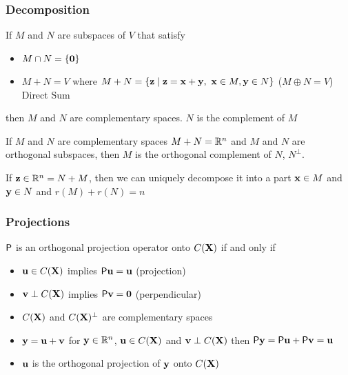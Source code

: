 \documentclass{beamer}
\begin{document}
\begin{frame}
  \frametitle{Decomposition}
  \begin{definition}
    If $M$ and $N$ are subspaces of $V$ that satisfy
    \begin{itemize}
    \item $M \cap N = \{ \zero \}$ \pause
    \item $M + N = V$ where $M+N = \{ \z \mid \z = \x + \y, \  \x \in
      M, \y \in N\}$  ($M \oplus N = V$) Direct Sum \pause
    \end{itemize}
then $M$ and $N$ are complementary spaces. \pause  $N$ is the
complement of $M$ \pause
\end{definition}
\begin{definition}
  If $M$ and $N$ are complementary spaces $M + N =\bbR^n$ and $M$ and
  $N$ are orthogonal subspaces, then $M$ is the orthogonal complement of
  $N$, $N^{\perp}$. 
\end{definition} \pause If $\z\in \bbR^n = N+M$, then we can uniquely
decompose it into a part $\x \in M$ and $\y \in N$ and $r(M) + r(N) =
n$
\end{frame}
\begin{frame} \frametitle{Projections}
\begin{definition}
$\P$ is an orthogonal projection operator onto $C(\X)$ if and only if \pause
  \begin{itemize}
  \item $\u \in C(\X)$ implies $\P \u = \u$ (projection) \pause
  \item $\v \perp C(\X)$ implies $\P \v = \zero$ (perpendicular) \pause
  \end{itemize}
\end{definition} 
\begin{itemize}
\item $C(\X)$ and $C(\X)^\perp$ are complementary spaces \pause
\item $\y = \u + \v$ for $\y \in \bbR^n$, $\u \in C(\X)$ and $\v \perp
  C(\X)$  then $\P \y = \P \u + \P \v = \u$ \pause
\item $\u$ is the orthogonal projection of $\y$ onto $C(\X)$

\end{itemize}



\end{frame}
\end{document}
